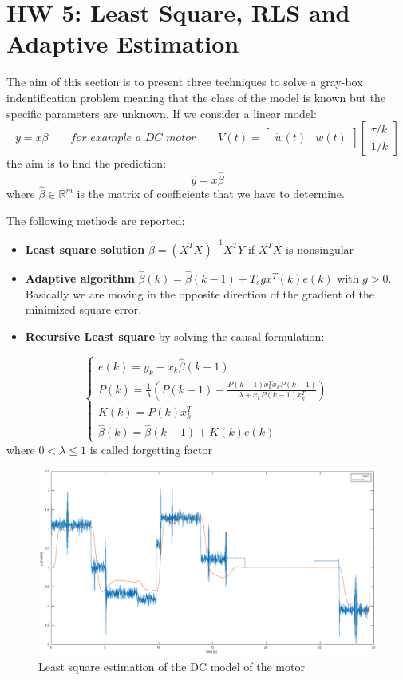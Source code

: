 \documentclass[a4paper,12pt]{article}
\begin{document}
\section{HW 5: Least Square, RLS and Adaptive Estimation}
The aim of this section is to present three techniques to solve a gray-box indentification problem meaning that the class of the model is known but the specific parameters are unknown. If we consider a linear model:
\[
    y = x\beta \qquad \textit{for example a DC motor} \qquad V(t) = \begin{bmatrix}
        \dot{w}(t) & w(t) 
    \end{bmatrix} \begin{bmatrix}
        \tau/k \\ 1/k
    \end{bmatrix}
\]
the aim is to find the prediction:
\[
    \hat{y} = x \hat{\beta}
\]
where $\hat{\beta} \in \mathbb{R}^m$ is the matrix of coefficients that we have to determine.

\bigskip
\noindent The following methods are reported:
\begin{itemize}
    \item \textbf{Least square solution} $\hat{\beta} = (X^TX)^{-1}X^TY$ if $X^TX$ is nonsingular
    \item \textbf{Adaptive algorithm} $\hat{\beta}(k) = \hat{\beta}(k-1) + T_sgx^T(k)e(k)$ with $g > 0$. Basically we are moving in the opposite direction of the gradient of the minimized square error.
    \item \textbf{Recursive Least square} by solving the causal formulation:
\end{itemize}
\[
    \begin{cases}
        e(k) = y_k -x_k\hat{\beta}(k-1) \\
        P(k) = \frac{1}{\lambda} \left ( P(k-1) - \frac{P(k-1)x_k^Tx_kP(k-1)}{\lambda + x_kP(k-1)x_k^T}\right) \\ 
        K(k) = P(k)x_k^T \\
        \hat{\beta}(k) = \hat{\beta}(k-1) + K(k)e(k) 
    \end{cases}
\]
where $0 < \lambda \leq 1 $ is called forgetting factor

\begin{figure}[H]
    \begin{center}
        \includegraphics[scale=0.3]{images/ls.eps}
    \end{center}
    \caption{Least square estimation of the DC model of the motor}
    \label{fig:ls}
\end{figure}
\end{document}
